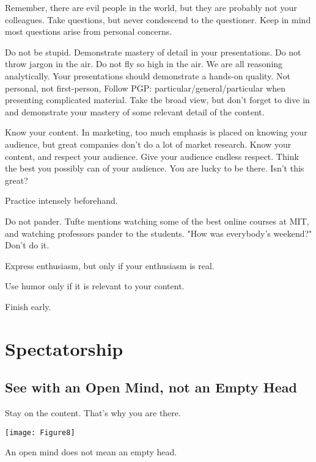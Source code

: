 \documentclass{tufte-handout}
\begin{document}
Remember, there are evil people in the world, but they are probably not your colleagues.  Take questions, but never condescend to the questioner. Keep in mind most questions arise from personal concerns.




Do not be stupid.  Demonstrate mastery of detail in your presentations.  Do not throw jargon in the air. Do not fly so high in the air.  We are all reasoning analytically.  Your presentations should demonstrate a hands-on quality.  Not personal, not first-person, Follow PGP: particular/general/particular when presenting complicated material. Take the broad view, but don't forget to dive in and demonstrate your mastery of some relevant detail of the content.

Know your content. In marketing, too much emphasis is placed on knowing your audience, but great companies don't do a lot of market research.  Know your content, and respect your audience.  Give your audience endless respect.  Think the best you possibly can of your audience.  You are lucky to be there. Isn't this great?

Practice intensely beforehand.

Do not pander.  Tufte mentions watching some of the best online courses at MIT, and watching professors pander to the students.  "How was everybody's weekend?" Don't do it.
%
% 
%
%
% 
%

Express enthusiasm, but only if your enthusiasm is real.

Use humor only if it is relevant to your content.

Finish early.


\section{Spectatorship}
\subsection{See with an Open Mind, not an Empty Head}
Stay on the content.  That's why you are there.


\begin{marginfigure}
\texttt{[image: Figure8]}
\caption{An open mind does not mean an empty head.}
\end{marginfigure}
\end{document}
